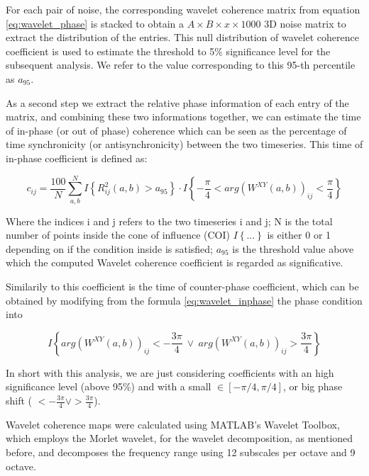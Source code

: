 \documentclass[10pt]{report}
\begin{document}
For each pair of noise, the corresponding wavelet coherence matrix from equation \ref{eq:wavelet_phase} is stacked to obtain a $A\times B \times x \times 1000$ 3D noise matrix to extract the distribution of the entries.
This null distribution of wavelet coherence coefficient is used to estimate the threshold to 5\% significance level for the subsequent analysis.
We refer to the value corresponding to this 95-th percentile as $a_{95}$.


As a second step we extract the relative phase information of each entry of the matrix, and combining these two informations together, we can estimate the time of in-phase (or out of phase) coherence which can be seen as the percentage of time synchronicity (or antisynchronicity) between the two timeseries. \cite{bernas-2018}
This time of in-phase coefficient is defined as:

\begin{equation} \label{eq:wavelet_inphase}
c_{ij} = \frac{100}{N}\sum_{a, b}^N I\left\{ R_{ij}^2(a,b) > a_{95}\right\}\cdot I\left\{-\frac{\pi}{4}<arg(W^{XY}(a, b))_{ij} < \frac{\pi}{4}  \right\}
\end{equation}

Where the indices i and j refers to the two timeseries i and j; N is the total number of points inside the cone of influence (COI) $I\left\{ ...\right\}$ is either 0 or 1 depending on if the condition inside is satisfied; $a_{95}$ is the threshold value above which the computed Wavelet coherence coefficient is regarded as significative.

Similarily to this coefficient is the time of counter-phase coefficient, which can be obtained by modifying from the formula \ref{eq:wavelet_inphase} the phase condition into

\[
I\left\{arg(W^{XY}(a, b))_{ij} < -\frac{3\pi}{4} \ \lor \ arg (W^{XY}(a, b))_{ij} >\frac{3\pi}{4} \right\}
\]

In short with this analysis, we are just considering coefficients with an high significance level (above 95\%) and with a small $\in [-\pi/4, \pi/4]$, or big phase shift ( $< -\frac{3\pi}{4}  \lor  >\frac{3 \pi}{4}$).

Wavelet coherence maps were calculated using MATLAB's Wavelet Toolbox, which employs the Morlet wavelet, for the wavelet decomposition, as  mentioned before, and decomposes the frequency range using 12 subscales per octave and 9 octave.

\end{document}
